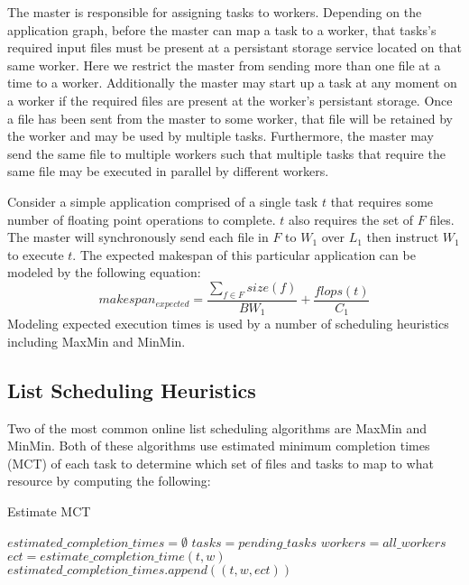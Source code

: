 The master is responsible for assigning tasks to workers. Depending
on the application graph, before the master can map a task to a worker,
that tasks's required input files must be present at a persistant storage
service located on that same worker. Here we restrict the master from
sending more than one file at a time to a worker. Additionally the master
may start up a task at any moment on a worker if the required files are present
at the worker's persistant storage. Once a file has been sent from the master
to some worker, that file will be retained by the worker and may be used by
multiple tasks. Furthermore, the master may send the same file to multiple
workers such that multiple tasks that require the same file may be executed
in parallel by different workers.

Consider a simple application comprised of a single task $t$ that requires
some number of floating point operations to complete. $t$ also requires the set
of $F$ files. The master will synchronously send each file in $F$ to $W_1$
over $L_1$ then instruct $W_1$ to execute $t$. The expected makespan of this
particular application can be modeled by the following equation:
$$ makespan_{expected} = \frac{\sum\limits_{f \in F}size(f)}{BW_1} + \frac{flops(t)} {C_1} $$
Modeling expected execution times is used by a number of scheduling heuristics
including MaxMin and MinMin.

\subsection*{List Scheduling Heuristics}

Two of the most common online list scheduling algorithms are MaxMin and MinMin.
Both of these algorithms use estimated minimum completion times (MCT) of each
task to determine which set of files and tasks to map to what resource by
computing the following:

\begin{algorithm}[H]
  \caption{Estimate MCT}
  \begin{algorithmic}
    \STATE $estimated\_completion\_times = \emptyset$
    \STATE $tasks = pending\_tasks$
    \STATE $workers = all\_workers$
        \STATE $ect = estimate\_completion\_time(t, w)$
        \STATE $estimated\_completion\_times.append((t, w, ect))$
      \ENDFOR
    \ENDFOR
  \end{algorithmic}
\end{algorithm}

